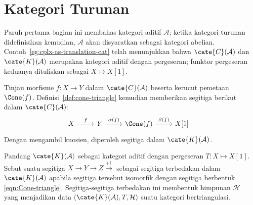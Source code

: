 
\section{Kategori Turunan}\label{sec:derived-cat}
\hypertarget{o014.aljabr2.chapter4.derived-categories}{ }

Paruh pertama bagian ini membahas kategori aditif $\mathcal{A}$; ketika
kategori turunan didefinisikan kemudian, $\mathcal{A}$ akan disyaratkan
sebagai kategori abelian. Contoh~\ref{eg:cplx-as-translation-cat} telah
menunjukkan bahwa $\cate{C}(\mathcal{A})$ dan $\cate{K}(\mathcal{A})$
merupakan kategori aditif dengan pergeseran; funktor pergeseran keduanya
dituliskan sebagai $X \mapsto X[1]$.

Tinjau morfisme $f: X \to Y$ dalam $\cate{C}(\mathcal{A})$ beserta kerucut
pemetaan $\Cone(f)$. Definisi~\ref{def:cone-triangle} kemudian memberikan
segitiga berikut dalam $\cate{C}(\mathcal{A})$:
\begin{equation}\label{eqn:Cone-triangle} \begin{tikzcd}
	X \arrow[r, "f"] & Y \arrow[r, "{\alpha(f)}"] & \Cone(f) \arrow[r, "\beta(f)"] & X[1]
\end{tikzcd}\end{equation}
Dengan mengambil kuosien, diperoleh segitiga dalam $\cate{K}(\mathcal{A})$.

\begin{teorema}\label{prop:cplx-triangulated}
	Pandang $\cate{K}(\mathcal{A})$ sebagai kategori aditif dengan pergeseran
	$T: X \mapsto X[1]$. Sebut suatu segitiga $X \to Y \to Z \xrightarrow{+1}$
	sebagai segitiga terbedakan dalam $\cate{K}(\mathcal{A})$ apabila segitiga
	tersebut isomorfik dengan segitiga berbentuk \eqref{eqn:Cone-triangle}.
	Segitiga-segitiga terbedakan ini membentuk himpunan $\mathcal{H}$ yang
	menjadikan data $(\cate{K}(\mathcal{A}), T, \mathcal{H})$ suatu kategori
	bertriangulasi.
\end{teorema}

